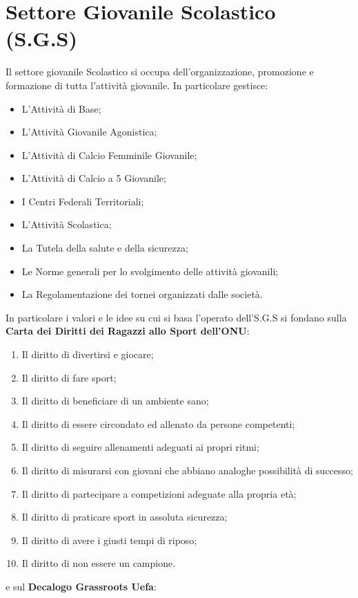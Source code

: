 \documentclass[../uefaC.tex]{subfiles}
\begin{document}
\section{Settore Giovanile Scolastico (S.G.S)}
Il settore giovanile Scolastico si occupa dell'organizzazione, promozione e formazione di tutta l'attività giovanile. In particolare gestisce:
\begin{itemize}
    \item L'Attività di Base;
    \item L'Attività Giovanile Agonistica;
    \item L'Attività di Calcio Femminile Giovanile;
    \item L'Attività di Calcio a 5 Giovanile;
    \item I Centri Federali Territoriali;
    \item L'Attività Scolastica;
    \item La Tutela della salute e della sicurezza;
    \item Le Norme generali per lo svolgimento delle attività giovanili;
    \item La Regolamentazione dei tornei organizzati dalle società.
\end{itemize}
In particolare i valori e le idee su cui si basa l'operato dell'S.G.S si fondano sulla \textbf{Carta dei Diritti dei Ragazzi allo Sport dell'ONU}: 
\begin{enumerate}
    \item Il diritto di divertirsi e giocare;
    \item Il diritto di fare sport;
    \item Il diritto di beneficiare di un ambiente sano;
    \item Il diritto di essere circondato ed allenato da persone competenti;
    \item Il diritto di seguire allenamenti adeguati ai propri ritmi;
    \item Il diritto di misurarsi con giovani che abbiano analoghe possibilità di successo;
    \item Il diritto di partecipare a competizioni adeguate alla propria età;
    \item Il diritto di praticare sport in assoluta sicurezza;
    \item Il diritto di avere i giusti tempi di riposo;
    \item Il diritto di non essere un campione.
\end{enumerate}
e sul \textbf{Decalogo Grassroots Uefa}:
\end{document}

